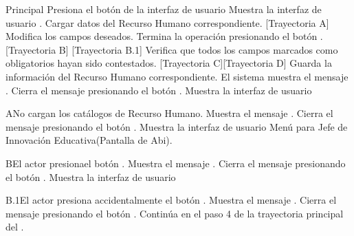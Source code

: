 \begin{UCtrayectoria}{Principal}
    \UCpaso[\UCactor] Presiona el botón  de la interfaz de usuario 
    \UCpaso Muestra la interfaz de usuario .
    \UCpaso Cargar datos del Recurso Humano correspondiente. [Trayectoria A]
    \UCpaso[\UCactor] Modifica los campos deseados.
    \UCpaso[\UCactor] Termina la operación presionando el botón . [Trayectoria B] [Trayectoria B.1]
    \UCpaso Verifica que todos los campos marcados como obligatorios hayan sido contestados. [Trayectoria C][Trayectoria D]
    \UCpaso Guarda la información del Recurso Humano correspondiente.
    \UCpaso El sistema muestra el mensaje .
    \UCpaso[\UCactor] Cierra el mensaje presionando el botón .
    \UCpaso Muestra la interfaz de usuario 
\end{UCtrayectoria}
\begin{UCtrayectoriaA}{A}{No cargan los catálogos de Recurso Humano.}
    \UCpaso Muestra el mensaje .
    \UCpaso[\UCactor] Cierra el mensaje presionando el botón .
\UCpaso Muestra la interfaz de usuario Menú para Jefe de Innovación Educativa(Pantalla de Abi).
\end{UCtrayectoriaA}
\begin{UCtrayectoriaA}{B}{El actor presionael botón .}
    \UCpaso Muestra el mensaje .
    \UCpaso[\UCactor] Cierra el mensaje presionando el botón .
    \UCpaso Muestra la interfaz de usuario 
\end{UCtrayectoriaA}
\begin{UCtrayectoriaA}{B.1}{El actor presiona accidentalmente el botón .}
    \UCpaso Muestra el mensaje .
    \UCpaso[\UCactor] Cierra el mensaje presionando el botón .
    \UCpaso Continúa en el paso 4 de la trayectoria principal del .
\end{UCtrayectoriaA}
